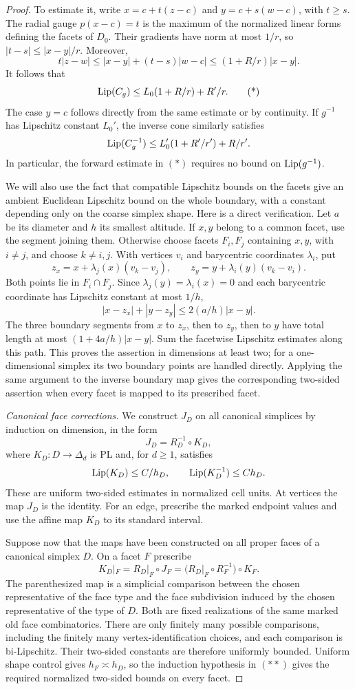 \begin{proof}
To estimate it, write
$x=c+t(z-c)$ and $y=c+s(w-c)$, with $t\geq s$.
The radial gauge $p(x-c)=t$ is the maximum of the normalized
linear forms defining the facets of $D_0$.  Their gradients have
norm at most $1/r$, so $|t-s|\leq |x-y|/r$.  Moreover,
\[
 t|z-w|\leq |x-y|+(t-s)|w-c|
 \leq (1+R/r)|x-y|.
\]
It follows that
\[
 \operatorname{Lip}(C_g)\leq L_0(1+R/r)+R'/r.                 \tag{*}
\]
The case $y=c$ follows directly from the same estimate or by
continuity.  If $g^{-1}$ has Lipschitz constant $L_0'$, the inverse
cone similarly satisfies
\[
 \operatorname{Lip}(C_g^{-1})\leq L_0'(1+R'/r')+R/r'.
\]
In particular, the forward estimate in $(*)$ requires no bound on
$\operatorname{Lip}(g^{-1})$.

We will also use the fact that compatible Lipschitz bounds on the
facets give an ambient Euclidean Lipschitz bound on the whole
boundary, with a constant depending only on the coarse simplex
shape.  Here is a direct verification.  Let $a$ be its diameter and
$h$ its smallest altitude.  If $x,y$ belong to a common facet,
use the segment joining them.  Otherwise choose facets $F_i,F_j$
containing $x,y$, with $i\ne j$, and choose $k\ne i,j$.
With vertices $v_i$ and barycentric coordinates $\lambda_i$, put
\[
 z_x=x+\lambda_j(x)(v_k-v_j),\qquad
 z_y=y+\lambda_i(y)(v_k-v_i).
\]
Both points lie in $F_i\cap F_j$.  Since
$\lambda_j(y)=\lambda_i(x)=0$ and each barycentric coordinate has
Lipschitz constant at most $1/h$,
\[
 |x-z_x|+|y-z_y|\leq 2(a/h)|x-y|.
\]
The three boundary segments from $x$ to $z_x$, then to $z_y$,
then to $y$ have total length at most
$(1+4a/h)|x-y|$.  Sum the facetwise Lipschitz estimates along this
path.  This proves the assertion in dimensions at least two;
for a one-dimensional simplex its two boundary points are handled
directly.  Applying the same argument to the inverse boundary map
gives the corresponding two-sided assertion when every facet is
mapped to its prescribed facet.

\emph{Canonical face corrections.}
We construct $J_D$ on all canonical simplices by induction on
dimension, in the form
\[
 J_D=R_D^{-1}\circ K_D,
\]
where $K_D:D\to\Delta_d$ is PL and, for $d\geq 1$, satisfies
\[
 \operatorname{Lip}(K_D)\leq C/h_D,
 \qquad \operatorname{Lip}(K_D^{-1})\leq C h_D.
\]
These are uniform two-sided estimates in normalized cell units.
At vertices the map $J_D$ is the identity.  For an edge, prescribe
the marked endpoint values and use the affine map $K_D$ to its
standard interval.

Suppose now that the maps have been constructed on all proper
faces of a canonical simplex $D$.  On a facet $F$ prescribe
\[
 K_D|_F
   =R_D|_F\circ J_F
   =\bigl(R_D|_F\circ R_F^{-1}\bigr)\circ K_F.       \tag{**}
\]
The parenthesized map is a simplicial comparison between the
chosen representative of the face type and the face subdivision
induced by the chosen representative of the type of $D$.
Both are fixed realizations of the same marked old face
combinatorics.  There are only finitely many possible comparisons,
including the finitely many vertex-identification choices, and
each comparison is bi-Lipschitz.  Their two-sided constants are
therefore uniformly bounded.  Uniform shape control gives
$h_F\asymp h_D$, so the induction hypothesis in $(**)$ gives the
required normalized two-sided bounds on every facet.


\end{proof}
